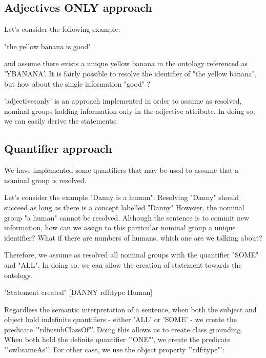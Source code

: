 \documentclass[twoside,a4paper,10pt]{report}
\begin{document}
\subsection{Adjectives ONLY approach}
\label{7ab02d5628e7f210c5eb8e862e7ddc56}%

Let's consider the following example:


\small
\begin{verbatimtab}
  "the yellow banana is good" 
\end{verbatimtab}
\normalsize
and assume there exists a unique yellow banana in the ontology referenced as 'Y{\textunderscore}BANANA'.
It is fairly possible to resolve the identifier of "the yellow banana", but how about the single information "good" ?

'adjectives{\textunderscore}only' is an approach implemented in order to assume as resolved, nominal groups holding information only in the adjective attribute.
In doing so, we can easily derive the statements: 


\small
\begin{verbatimtab}
\end{verbatimtab}
\normalsize

\subsection{Quantifier approach}
\label{3c48ef2a7bfacf5e512a249e797564d3}%

We have implemented some quantifiers that may be used to assume that a nominal group is resolved.

Let's consider the example "Danny is a human". Resolving "Danny" should succeed as long as there is a concept labelled "Danny"
However, the nominal group "a human" cannot be resolved. Although the sentence is to commit new information, how can we assign to this particular nominal group a unique identifier? What if there are numbers of humans, which one are we talking about? 

Therefore, we assume as resolved all nominal groups with the quantifier "SOME" and "ALL". In doing so, we can allow the creation of statement towards the ontology.



\small
\begin{verbatimtab}
  "Statement created"
  [DANNY rdf:type Human]
\end{verbatimtab}
\normalsize
Regardless the semantic interpretation of a sentence, when both the subject and object hold indefinite quantifiers - either 'ALL' or 'SOME' - we create the predicate '"rdfs:subClassOf"'.
Doing this allows us to create class grounding. When both hold the definite quantifier '"ONE"', we create the predicate '"owl:sameAs"'.  For other case, we use the object property '"rdf:type"':
\end{document}
